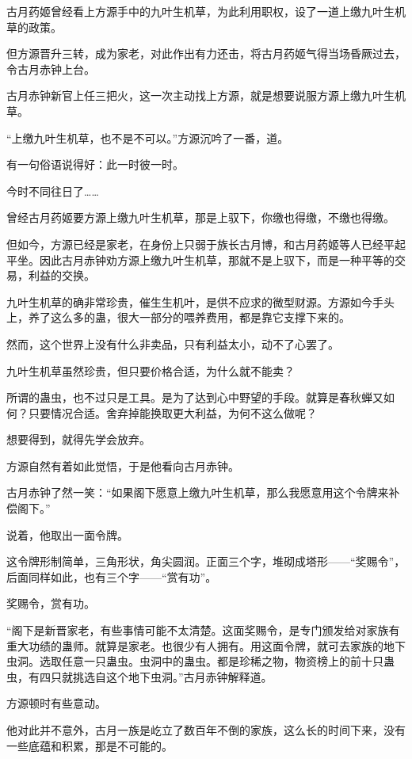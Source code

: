 
\begin{this_body}

古月药姬曾经看上方源手中的九叶生机草，为此利用职权，设了一道上缴九叶生机草的政策。

但方源晋升三转，成为家老，对此作出有力还击，将古月药姬气得当场昏厥过去，令古月赤钟上台。

古月赤钟新官上任三把火，这一次主动找上方源，就是想要说服方源上缴九叶生机草。

“上缴九叶生机草，也不是不可以。”方源沉吟了一番，道。

有一句俗语说得好：此一时彼一时。

今时不同往日了……

曾经古月药姬要方源上缴九叶生机草，那是上驭下，你缴也得缴，不缴也得缴。

但如今，方源已经是家老，在身份上只弱于族长古月博，和古月药姬等人已经平起平坐。因此古月赤钟劝方源上缴九叶生机草，那就不是上驭下，而是一种平等的交易，利益的交换。

九叶生机草的确非常珍贵，催生生机叶，是供不应求的微型财源。方源如今手头上，养了这么多的蛊，很大一部分的喂养费用，都是靠它支撑下来的。

然而，这个世界上没有什么非卖品，只有利益太小，动不了心罢了。

九叶生机草虽然珍贵，但只要价格合适，为什么就不能卖？

所谓的蛊虫，也不过只是工具。是为了达到心中野望的手段。就算是春秋蝉又如何？只要情况合适。舍弃掉能换取更大利益，为何不这么做呢？

想要得到，就得先学会放弃。

方源自然有着如此觉悟，于是他看向古月赤钟。

古月赤钟了然一笑：“如果阁下愿意上缴九叶生机草，那么我愿意用这个令牌来补偿阁下。”

说着，他取出一面令牌。

这令牌形制简单，三角形状，角尖圆润。正面三个字，堆砌成塔形——“奖赐令”，后面同样如此，也有三个字——“赏有功”。

奖赐令，赏有功。

“阁下是新晋家老，有些事情可能不太清楚。这面奖赐令，是专门颁发给对家族有重大功绩的蛊师。就算是家老。也很少有人拥有。用这面令牌，就可去家族的地下虫洞。选取任意一只蛊虫。虫洞中的蛊虫。都是珍稀之物，物资榜上的前十只蛊虫，有四只就挑选自这个地下虫洞。”古月赤钟解释道。

方源顿时有些意动。

他对此并不意外，古月一族是屹立了数百年不倒的家族，这么长的时间下来，没有一些底蕴和积累，那是不可能的。


\end{this_body}
